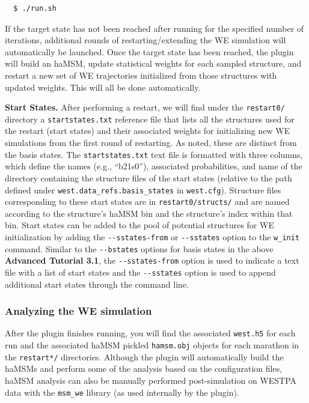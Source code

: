 \begin{verbatim}
  $ ./run.sh
\end{verbatim}

If the target state has not been reached after running for the specified number of iterations, additional rounds of restarting/extending the WE simulation will automatically be launched. 
Once the target state has been reached, the plugin will build an haMSM, update statistical weights for each sampled structure, and restart a new set of WE trajectories initialized from those structures with updated weights. 
This will all be done automatically.

\textbf{Start States.} After performing a restart, we will find under the \verb|restart0/| directory a \verb|startstates.txt| reference file that lists all the structures used for the restart (start states) and their associated weights for initializing new WE simulations from the first round of restarting. 
As noted, these are distinct from the basis states. 
The \verb|startstates.txt| text file is formatted with three columns, which define the names (e.g., “b21s0”), associated probabilities, and name of the directory containing the structure files of the start states (relative to the path defined under \verb|west.data_refs.basis_states| in \verb|west.cfg|). 
Structure files corresponding to these start states are in \verb|restart0/structs/| and are named according to the structure’s haMSM bin and the structure’s index within that bin. 
Start states can be added to the pool of potential structures for WE initialization by adding the \verb|--sstates-from| or \verb|--sstates| option to the \verb|w_init| command. 
Similar to the \verb|--bstates| options for basis states in the above \textbf{Advanced Tutorial 3.1}, the \verb|--sstates-from| option is used to indicate a text file with a list of start states and the \verb|--sstates| option is used to append additional start states through the command line.

\subsubsection{Analyzing the WE simulation}
After the plugin finishes running, you will find the associated \verb|west.h5| for each run and the associated haMSM pickled \verb|hamsm.obj| objects for each marathon in the \verb|restart*/| directories. 
Although the plugin will automatically build the haMSMs and perform some of the analysis based on the configuration files, haMSM analysis can also be manually performed post-simulation on WESTPA data with the \verb|msm_we| library (as used internally by the plugin).

